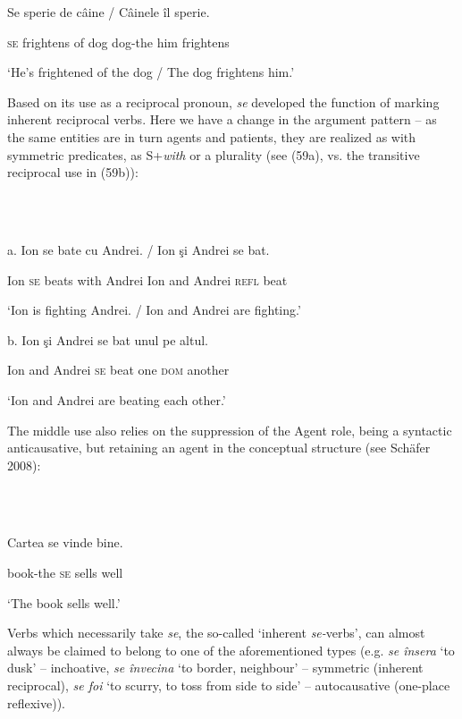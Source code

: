 \documentclass[output=paper]{langsci/langscibook}
\begin{document}
          Se sperie     de câine / Câinele îl    sperie.

\textsc{se} frightens of dog     dog-the him frightens

‘He’s frightened of the dog / The dog frightens him.’

Based on its use as a reciprocal pronoun, \textit{se} developed the function of marking inherent reciprocal verbs. Here we have a change in the argument pattern – as the same entities are in turn agents and patients, they are realized as with symmetric predicates, as S+\textit{with} or a plurality (see (59a), vs. the transitive reciprocal use in (59b)):

\ea%
    \label{ex:key:59}
    \gll\\
        \\
    \glt
    \z

          a.   Ion se  bate   cu   Andrei.   /   Ion şi     Andrei se     bat.

      Ion \textsc{se} beats with Andrei        Ion and Andrei \textsc{refl} beat

      ‘Ion is fighting Andrei. / Ion and Andrei are fighting.’

  b.   Ion şi     Andrei se bat   unul pe     altul.

        Ion and Andrei  \textsc{se} beat one  \textsc{dom} another

        ‘Ion and Andrei are beating each other.’

The middle use also relies on the suppression of the Agent role, being a syntactic anticausative, but retaining an agent in the conceptual structure (see Schäfer 2008):

\ea%
    \label{ex:key:60}
    \gll\\
        \\
    \glt
    \z

          Cartea    se vinde bine. 

book-the \textsc{se} sells  well

‘The book sells well.’

Verbs which necessarily take \textit{se}, the so-called ‘inherent \textit{se-}verbs’, can almost always be claimed to belong to one of the aforementioned types (e.g. \textit{se însera} ‘to dusk’ – inchoative, \textit{se învecina} ‘to border, neighbour’ – symmetric (inherent reciprocal), \textit{se foi} ‘to scurry, to toss from side to side’ – autocausative (one-place reflexive)).
\end{document}
